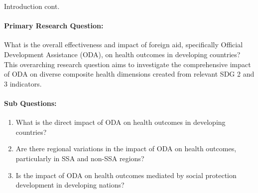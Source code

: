 \documentclass[aspectratio=169,handout, 10pt]{beamer}
\begin{document}
\begin{frame}{Introduction cont.}
\paragraph{\textbf{Primary Research Question:}}
\begin{itemize*}
    \item What is the overall effectiveness and impact of foreign aid, specifically Official Development Assistance (ODA), on health outcomes in developing countries? This overarching research question aims to investigate the comprehensive impact of ODA on diverse composite health dimensions created from relevant SDG 2 and 3 indicators.\\  
\end{itemize*}
\paragraph{\textbf{Sub Questions:}}
    \begin{enumerate}[i]
        \item What is the direct impact of ODA on health outcomes in developing countries?
        \item Are there regional variations in the impact of ODA on health outcomes, particularly in SSA and non-SSA regions?
        \item Is the impact of ODA on health outcomes mediated by social protection development in developing nations?
    \end{enumerate}

\end{frame}


\end{document}
